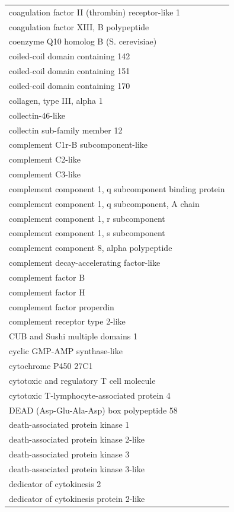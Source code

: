 \documentclass[english]{article}\usepackage[]{graphicx}\usepackage[]{color}
\begin{document}
\begin{longtable}{l}
coagulation factor II (thrombin) receptor-like 1 \\ 
coagulation factor XIII, B polypeptide \\ 
coenzyme Q10 homolog B (S. cerevisiae) \\ 
coiled-coil domain containing 142 \\ 
coiled-coil domain containing 151 \\ 
coiled-coil domain containing 170 \\ 
collagen, type III, alpha 1 \\ 
collectin-46-like \\ 
collectin sub-family member 12 \\ 
complement C1r-B subcomponent-like \\ 
complement C2-like \\ 
complement C3-like \\ 
complement component 1, q subcomponent binding protein \\ 
complement component 1, q subcomponent, A chain \\ 
complement component 1, r subcomponent \\ 
complement component 1, s subcomponent \\ 
complement component 8, alpha polypeptide \\ 
complement decay-accelerating factor-like \\ 
complement factor B \\ 
complement factor H \\ 
complement factor properdin \\ 
complement receptor type 2-like \\ 
CUB and Sushi multiple domains 1 \\ 
cyclic GMP-AMP synthase-like \\ 
cytochrome P450 27C1 \\ 
cytotoxic and regulatory T cell molecule \\ 
cytotoxic T-lymphocyte-associated protein 4 \\ 
DEAD (Asp-Glu-Ala-Asp) box polypeptide 58 \\ 
death-associated protein kinase 1 \\ 
death-associated protein kinase 2-like \\ 
death-associated protein kinase 3 \\ 
death-associated protein kinase 3-like \\ 
dedicator of cytokinesis 2 \\ 
dedicator of cytokinesis protein 2-like \\ 

\end{longtable}
\end{document}
